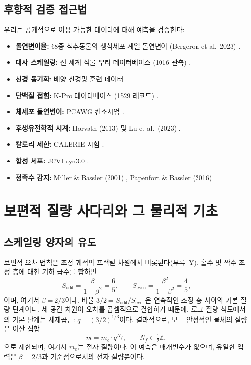 \documentclass[11pt,a4paper]{article}
\begin{document}
	\subsection{후향적 검증 접근법}
	
	우리는 공개적으로 이용 가능한 데이터에 대해 예측을 검증한다:
	\begin{itemize}
		\item \textbf{돌연변이율:} 68종 척추동물의 생식세포 계열 돌연변이 (Bergeron et al.\ 2023) \cite{Bergeron2023a}.
		\item \textbf{대사 스케일링:} 전 세계 식물 뿌리 데이터베이스 (1016 관측) \cite{Yuan2020}.
		\item \textbf{신경 동기화:} 배양 신경망 훈련 데이터 \cite{PLOS2025b}.
		\item \textbf{단백질 접힘:} K‑Pro 데이터베이스 (1529 레코드) \cite{Turina2023}.
		\item \textbf{체세포 돌연변이:} PCAWG 컨소시엄 \cite{PCAWG2020}.
		\item \textbf{후생유전학적 시계:} Horvath (2013) 및 Lu et al.\ (2023) \cite{Horvath2013, Lu2023}.
		\item \textbf{칼로리 제한:} CALERIE 시험 \cite{CALERIE2018, CALERIE2024}.
		\item \textbf{합성 세포:} JCVI‑syn3.0 \cite{Hutchison2016, Pelletier2023}.
		\item \textbf{정족수 감지:} Miller \& Bassler (2001) \cite{Miller2001}, Papenfort \& Bassler (2016) \cite{Papenfort2016}.
	\end{itemize}
	
	\section{보편적 질량 사다리와 그 물리적 기초}
	
	\subsection{스케일링 양자의 유도}
	
	보편적 오차 법칙은 조정 궤적의 프랙털 차원에서 비롯된다(부록~Y). 홀수 및 짝수 조정 층에 대한 기하 급수를 합하면
	\[
	S_{\mathrm{odd}} = \frac{\beta}{1-\beta^2} = \frac{6}{5}, \qquad
	S_{\mathrm{even}} = \frac{\beta^2}{1-\beta^2} = \frac{4}{5},
	\]
	이며, 여기서 \(\beta = 2/3\)이다. 비율 \(3/2 = S_{\mathrm{odd}}/S_{\mathrm{even}}\)은 연속적인 조정 층 사이의 기본 질량 단계이다. 세 공간 차원이 오차를 곱셈적으로 결합하기 때문에, 로그 질량 척도에서의 기본 단계는 세제곱근: \(q = (3/2)^{1/3}\)이다. 결과적으로, 모든 안정적인 물체의 질량은 이산 집합
	\begin{equation}
		m = m_e \cdot q^{N_f}, \qquad N_f \in \tfrac12\mathbb{Z},
		\label{eq:quantization}
	\end{equation}
	으로 제한되며, 여기서 \(m_e\)는 전자 질량이다. 이 예측은 매개변수가 없으며, 유일한 입력은 \(\beta = 2/3\)과 기준점으로서의 전자 질량뿐이다.
	
\end{document}
